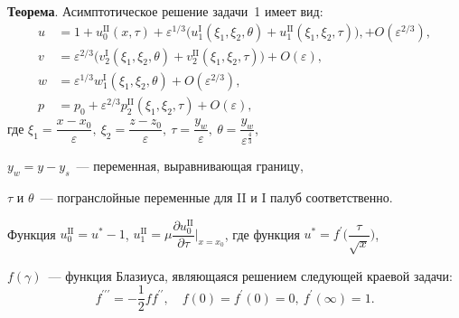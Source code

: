 \documentclass[../master.tex]{subfiles}
\begin{document}
\textbf{Теорема}. Асимптотическое решение задачи~1 имеет вид:
\begin{align*}
u &= 1 + u_0^{\text{II}}(x, \tau)  + 
 \varepsilon^{1/3}\big(u_1^{\text{I}}( \xi_1, \xi_2, \theta)  + u_1^{\text{II}}(  \xi_1, \xi_2, \tau)\big), + O(\varepsilon^{2/3}), \\
v&= \varepsilon^{2/3}\big(v_2^{\text{I}}(\xi_1, \xi_2, \theta) + v_2^{\text{II}}(\xi_1, \xi_2, \tau)\big) +  O(\varepsilon), \\
w &= \varepsilon^{1/3} w_1^{\text{I}}(  \xi_1, \xi_2, \theta) + O(\varepsilon^{2/3}), \\
p &= p_0 + \varepsilon^{2/3}p_2^{\text{II}}(\xi_1, \xi_2, \tau)+ O(\varepsilon),
\end{align*}
где $\displaystyle \xi_1 = \dfrac{x - x_0}{\varepsilon},\ 
\xi_2 = \dfrac{z - z_0}{\varepsilon}, \ 
\tau = \dfrac{y_w}{\varepsilon},\ \theta= \dfrac{y_w}{\varepsilon^{\frac{4}{3}}}$,

$y_w = y-y_s$~--- переменная, выравнивающая границу,

$\tau$ и $\theta$~--- погранслойные переменные для II и I палуб соответственно. 

 Функция $u_0^{\text{II}} = u^*-1$, $u_1^\mathrm{II} = \mu \dfrac{\partial u_0^{\text{II}}}{\partial \tau}\bigg|_{ x=x_0 }$, где
функция $u^* =  f^{\prime}\bigg(\dfrac{\tau}{\sqrt{x}}\bigg) $, 

$f(\gamma)$~--- функция Блазиуса,  являющаяся решением следующей краевой задачи: 
\[ f^{\prime \prime \prime} = -\frac{1}{2}f f^{\prime \prime}, \quad 
f(0) = f^{\prime}(0) = 0, \
f^{\prime}(\infty) = 1.
\]
\end{document}
